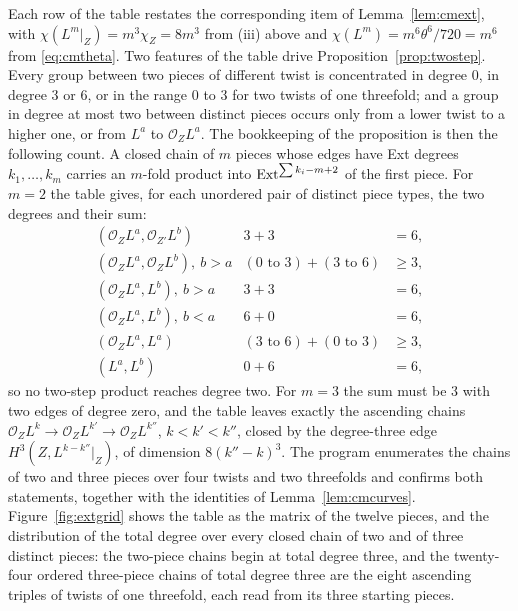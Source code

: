 Each row of the table restates the corresponding item of Lemma~\ref{lem:cmext}, with $\chi(L^{m}|_{Z})=m^{3}\chi_{Z}=8m^{3}$ from (iii) above and $\chi(L^{m})=m^{6}\theta^{6}/720=m^{6}$ from \eqref{eq:cmtheta}. Two features of the table drive Proposition~\ref{prop:twostep}. Every group between two pieces of different twist is concentrated in degree $0$, in degree $3$ or $6$, or in the range $0$ to $3$ for two twists of one threefold; and a group in degree at most two between distinct pieces occurs only from a lower twist to a higher one, or from $L^{a}$ to $\mathcal{O}_{Z}L^{a}$. The bookkeeping of the proposition is then the following count. A closed chain of $m$ pieces whose edges have Ext degrees $k_{1},\dots,k_{m}$ carries an $m$-fold product into $\mathrm{Ext}^{\sum k_{i}-m+2}$ of the first piece. For $m=2$ the table gives, for each unordered pair of distinct piece types, the two degrees and their sum:
\begin{equation}\label{eq:cmtwostep}
\begin{array}{lll}
(\mathcal{O}_{Z}L^{a},\mathcal{O}_{Z'}L^{b}) & 3+3 & =6,\\
(\mathcal{O}_{Z}L^{a},\mathcal{O}_{Z}L^{b}),\ b>a & (0\text{ to }3)+(3\text{ to }6) & \ge3,\\
(\mathcal{O}_{Z}L^{a},L^{b}),\ b>a & 3+3 & =6,\\
(\mathcal{O}_{Z}L^{a},L^{b}),\ b<a & 6+0 & =6,\\
(\mathcal{O}_{Z}L^{a},L^{a}) & (3\text{ to }6)+(0\text{ to }3) & \ge3,\\
(L^{a},L^{b}) & 0+6 & =6,
\end{array}
\end{equation}
so no two-step product reaches degree two. For $m=3$ the sum must be $3$ with two edges of degree zero, and the table leaves exactly the ascending chains $\mathcal{O}_{Z}L^{k}\to\mathcal{O}_{Z}L^{k'}\to\mathcal{O}_{Z}L^{k''}$, $k<k'<k''$, closed by the degree-three edge $H^{3}(Z,L^{k-k''}|_{Z})$, of dimension $8(k''-k)^{3}$. The program  enumerates the chains of two and three pieces over four twists and two threefolds and confirms both statements, together with the identities of Lemma~\ref{lem:cmcurves}. Figure~\ref{fig:extgrid} shows the table as the matrix of the twelve pieces, and the distribution of the total degree over every closed chain of two and of three distinct pieces: the two-piece chains begin at total degree three, and the twenty-four ordered three-piece chains of total degree three are the eight ascending triples of twists of one threefold, each read from its three starting pieces.

